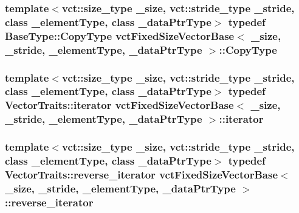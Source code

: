 \hypertarget{classvct_fixed_size_vector_base_a136da6f4bb90964f3f156533f85416d9}{
\subsubsection[{Copy\-Type}]{\setlength{\rightskip}{0pt plus 5cm}template$<$vct\-::size\-\_\-type \-\_\-size, vct\-::stride\-\_\-type \-\_\-stride, class \-\_\-element\-Type, class \-\_\-data\-Ptr\-Type$>$ typedef {\bf Base\-Type\-::\-Copy\-Type} {\bf vct\-Fixed\-Size\-Vector\-Base}$<$ \-\_\-size, \-\_\-stride, \-\_\-element\-Type, \-\_\-data\-Ptr\-Type $>$\-::{\bf Copy\-Type}}}\label{classvct_fixed_size_vector_base_a136da6f4bb90964f3f156533f85416d9}
\hypertarget{classvct_fixed_size_vector_base_a541b35f08260e286587f4aa516a83d82}{
\subsubsection[{iterator}]{\setlength{\rightskip}{0pt plus 5cm}template$<$vct\-::size\-\_\-type \-\_\-size, vct\-::stride\-\_\-type \-\_\-stride, class \-\_\-element\-Type, class \-\_\-data\-Ptr\-Type$>$ typedef {\bf Vector\-Traits\-::iterator} {\bf vct\-Fixed\-Size\-Vector\-Base}$<$ \-\_\-size, \-\_\-stride, \-\_\-element\-Type, \-\_\-data\-Ptr\-Type $>$\-::{\bf iterator}}}\label{classvct_fixed_size_vector_base_a541b35f08260e286587f4aa516a83d82}
\hypertarget{classvct_fixed_size_vector_base_af7dffb6aaecd3c33141026726e3a4852}{
\subsubsection[{reverse\-\_\-iterator}]{\setlength{\rightskip}{0pt plus 5cm}template$<$vct\-::size\-\_\-type \-\_\-size, vct\-::stride\-\_\-type \-\_\-stride, class \-\_\-element\-Type, class \-\_\-data\-Ptr\-Type$>$ typedef {\bf Vector\-Traits\-::reverse\-\_\-iterator} {\bf vct\-Fixed\-Size\-Vector\-Base}$<$ \-\_\-size, \-\_\-stride, \-\_\-element\-Type, \-\_\-data\-Ptr\-Type $>$\-::{\bf reverse\-\_\-iterator}}}\label{classvct_fixed_size_vector_base_af7dffb6aaecd3c33141026726e3a4852}
